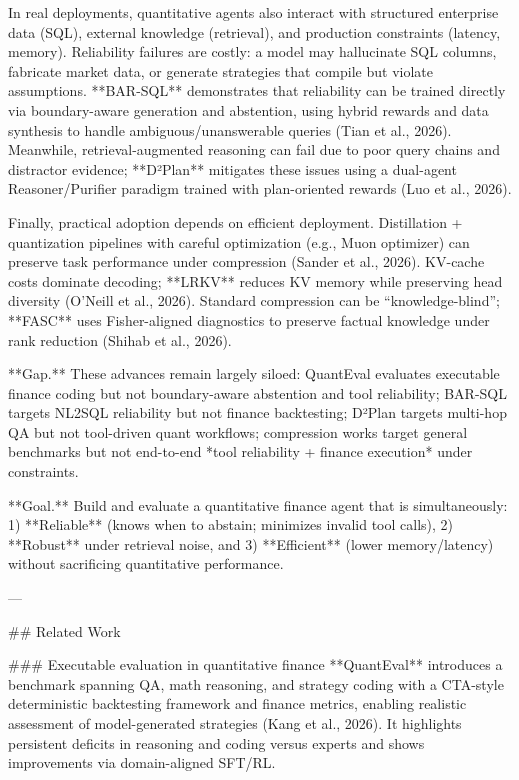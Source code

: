 In real deployments, quantitative agents also interact with structured enterprise data (SQL), external knowledge (retrieval), and production constraints (latency, memory). Reliability failures are costly: a model may hallucinate SQL columns, fabricate market data, or generate strategies that compile but violate assumptions. **BAR-SQL** demonstrates that reliability can be trained directly via boundary-aware generation and abstention, using hybrid rewards and data synthesis to handle ambiguous/unanswerable queries (Tian et al., 2026). Meanwhile, retrieval-augmented reasoning can fail due to poor query chains and distractor evidence; **D²Plan** mitigates these issues using a dual-agent Reasoner/Purifier paradigm trained with plan-oriented rewards (Luo et al., 2026).  

Finally, practical adoption depends on efficient deployment. Distillation + quantization pipelines with careful optimization (e.g., Muon optimizer) can preserve task performance under compression (Sander et al., 2026). KV-cache costs dominate decoding; **LRKV** reduces KV memory while preserving head diversity (O’Neill et al., 2026). Standard compression can be “knowledge-blind”; **FASC** uses Fisher-aligned diagnostics to preserve factual knowledge under rank reduction (Shihab et al., 2026).  

**Gap.** These advances remain largely siloed: QuantEval evaluates executable finance coding but not boundary-aware abstention and tool reliability; BAR-SQL targets NL2SQL reliability but not finance backtesting; D²Plan targets multi-hop QA but not tool-driven quant workflows; compression works target general benchmarks but not end-to-end *tool reliability + finance execution* under constraints.  

**Goal.** Build and evaluate a quantitative finance agent that is simultaneously:  
1) **Reliable** (knows when to abstain; minimizes invalid tool calls),  
2) **Robust** under retrieval noise, and  
3) **Efficient** (lower memory/latency) without sacrificing quantitative performance.

---

## Related Work  

### Executable evaluation in quantitative finance  
**QuantEval** introduces a benchmark spanning QA, math reasoning, and strategy coding with a CTA-style deterministic backtesting framework and finance metrics, enabling realistic assessment of model-generated strategies (Kang et al., 2026). It highlights persistent deficits in reasoning and coding versus experts and shows improvements via domain-aligned SFT/RL.

